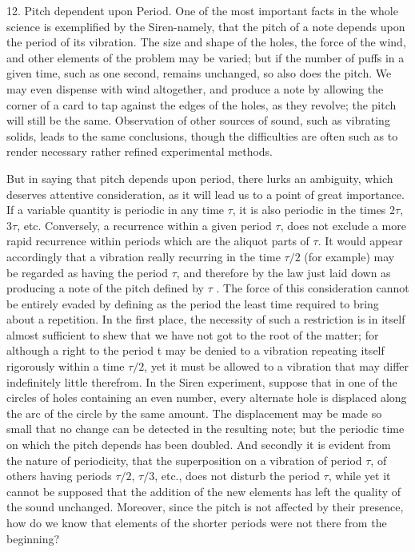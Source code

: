 12.  Pitch dependent upon Period.  One of the most important facts in the whole
science is exemplified by the Siren-namely, that the pitch of a note depends
upon the period of its vibration. The size and shape of the holes, the force of
the wind, and other elements of the problem may be varied; but if the number of
puffs in a given time, such as one second, remains unchanged, so also does the
pitch. We may even dispense with wind altogether, and produce a note by
allowing the corner of a card to tap against the edges of the holes, as they
revolve; the pitch will still be the same.  Observation of other sources of
sound, such as vibrating solids, leads to the same conclusions, though the
difficulties are often such as to render necessary rather refined experimental
methods.

But in saying that pitch depends upon period, there lurks an ambiguity, which
deserves attentive consideration, as it will lead us to a point of great
importance. If a variable quantity is periodic in any time \(\tau\), it is also
periodic in the times \(2 \tau\), \(3 \tau\), etc. Conversely, a recurrence
within a given period \(\tau\), does not exclude a more rapid recurrence within
periods which are the aliquot parts of \(\tau\). It would appear accordingly
that a vibration really recurring in the time \(\tau / 2\) (for example) may be
regarded as having the period \(\tau\), and therefore by the law just laid down
as producing a note of the pitch defined by \(\tau\) . The force of this
consideration cannot be entirely evaded by defining as the period the least
time required to bring about a repetition. In the first place, the necessity of
such a restriction is in itself almost sufficient to shew that we have not got
to the root of the matter; for although a right to the period t may be denied
to a vibration repeating itself rigorously within a time \(\tau /2\), yet it
must be allowed to a vibration that may differ indefinitely little therefrom.
In the Siren experiment, suppose that in one of the circles of holes containing
an even number, every alternate hole is displaced along the arc of the circle
by the same amount. The displacement may be made so small that no change can be
detected in the resulting note; but the periodic time on which the pitch
depends has been doubled. And secondly it is evident from the nature of
periodicity, that the superposition on a vibration of period \(\tau\), of
others having periods \(\tau /2\), \(\tau /3\), etc., does not disturb the
period \(\tau\), while yet it cannot be supposed that the addition of the new
elements has left the quality of the sound unchanged.  Moreover, since the
pitch is not affected by their presence, how do we know that elements of the
shorter periods were not there from the beginning?

